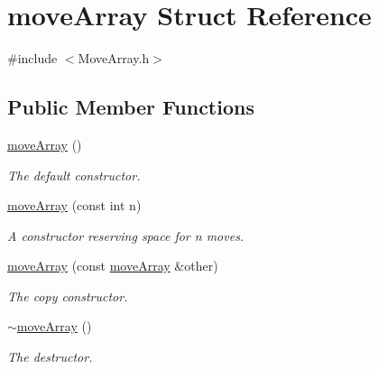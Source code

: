 \hypertarget{structmoveArray}{}\section{move\+Array Struct Reference}
\label{structmoveArray}


{\ttfamily \#include $<$Move\+Array.\+h$>$}

\subsection*{Public Member Functions}
\begin{DoxyCompactItemize}
\item 
\mbox{\label{structmoveArray_adad62027e18e94b8034a5162a161e979}} 
\hyperlink{structmoveArray_adad62027e18e94b8034a5162a161e979}{move\+Array} ()
\begin{DoxyCompactList}\small\item\em The default constructor. \end{DoxyCompactList}\item 
\mbox{\label{structmoveArray_a3cb7e6bc3daac07f3005e7ca18af4589}} 
\hyperlink{structmoveArray_a3cb7e6bc3daac07f3005e7ca18af4589}{move\+Array} (const int n)
\begin{DoxyCompactList}\small\item\em A constructor reserving space for {\itshape n} moves. \end{DoxyCompactList}\item 
\mbox{\label{structmoveArray_a78117ae0946c2a61ff86a832c420c854}} 
\hyperlink{structmoveArray_a78117ae0946c2a61ff86a832c420c854}{move\+Array} (const \hyperlink{structmoveArray}{move\+Array} \&other)
\begin{DoxyCompactList}\small\item\em The copy constructor. \end{DoxyCompactList}\item 
\mbox{\label{structmoveArray_ac0a694dea63dc46f9c524766aa457d4f}} 
\hyperlink{structmoveArray_ac0a694dea63dc46f9c524766aa457d4f}{$\sim$move\+Array} ()
\begin{DoxyCompactList}\small\item\em The destructor. \end{DoxyCompactList}\item 

\end{DoxyCompactItemize}
